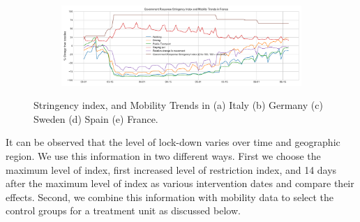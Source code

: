 \documentclass[preprint,authoryear,12pt]{elsarticle}
\begin{document}
\begin{figure}
	\begin{subfigure}[b]{\textwidth}
		\centering
		\includegraphics[width=0.84\linewidth,height=0.18\textheight]{Mobility Trends in France}
	\end{subfigure}
	
	\caption[Mobility Trends]{Stringency index, and Mobility Trends in (a) Italy (b) Germany (c) Sweden (d) Spain (e) France.}
	\label{fig2} 
\end{figure}

    It can be observed that the level of lock-down varies over time and geographic region. We use this information in two different ways. First we choose the maximum level of index, first increased level of restriction index, and 14 days after the maximum level of index as various intervention dates and compare their effects. Second, we combine this information with mobility data to select the control groups for a treatment unit as discussed below.
    
\end{document}
